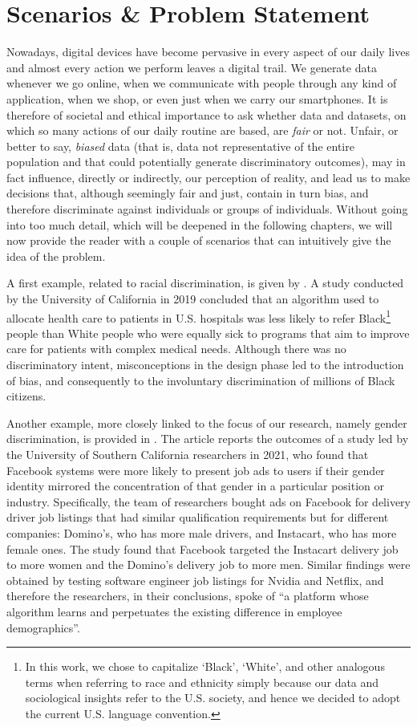 \section{Scenarios \& Problem Statement}
Nowadays, digital devices have become pervasive in every aspect of our daily lives and almost every action we perform leaves a digital trail. We generate data whenever we go online, when we communicate with people through any kind of application, when we shop, or even just when we carry our smartphones. It is therefore of societal and ethical importance to ask whether data and datasets, on which so many actions of our daily routine are based, are \textit{fair} or not. Unfair, or better to say, \textit{biased} data (that is, data not representative of the entire population and that could potentially generate discriminatory outcomes), may in fact influence, directly or indirectly, our perception of reality, and lead us to make decisions that, although seemingly fair and just, contain in turn bias, and therefore discriminate against individuals or groups of individuals. Without going into too much detail, which will be deepened in the following chapters, we will now provide the reader with a couple of scenarios that can intuitively give the idea of the problem.

A first example, related to racial discrimination, is given by \cite{ledford2019millions}. A study conducted by the University of California in 2019 concluded that an algorithm used to allocate health care to patients in U.S. hospitals was less likely to refer Black\footnote{In this work, we chose to capitalize `Black', `White', and other analogous terms when referring to race and ethnicity simply because our data and sociological insights refer to the U.S. society, and hence we decided to adopt the current U.S. language convention.} people than White people who were equally sick to programs that aim to improve care for patients with complex medical needs. Although there was no discriminatory intent, misconceptions in the design phase led to the introduction of bias, and consequently to the involuntary discrimination of millions of Black citizens.

Another example, more closely linked to the focus of our research, namely gender discrimination, is provided in \cite{horwitz2021facebook}. The article reports the outcomes of a study led by the University of Southern California researchers in 2021, who found that Facebook systems were more likely to present job ads to users if their gender identity mirrored the concentration of that gender in a particular position or industry. Specifically, the team of researchers bought ads on Facebook for delivery driver job listings that had similar qualification requirements but for different companies: Domino's, who has more male drivers, and Instacart, who has more female ones. The study found that Facebook targeted the Instacart delivery job to more women and the Domino's delivery job to more men. Similar findings were obtained by testing software engineer job listings for Nvidia and Netflix, and therefore the researchers, in their conclusions, spoke of ``a platform whose algorithm learns and perpetuates the existing difference in employee demographics''.

